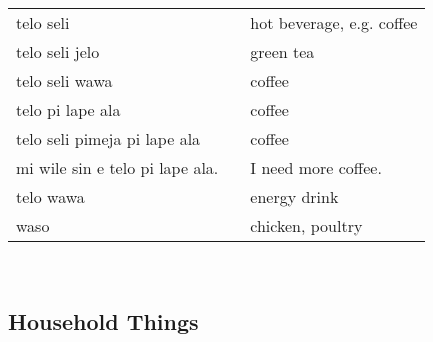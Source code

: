 \begin{supertabular}{p{4,5cm}|ll}
    telo seli                       &  & hot beverage, e.g. coffee                              \\
    telo seli jelo                  &  & green tea                                              \\
    telo seli wawa                  &  & coffee                                                 \\
    telo pi lape ala                &  & coffee                                                 \\
    telo seli pimeja pi lape ala    &  & coffee                                                 \\
    mi wile sin e telo pi lape ala. &  & I need more coffee.                                    \\
    telo wawa                       &  & energy drink                                           \\
    waso                            &  & chicken, poultry                                       \\
\end{supertabular} \\

\subsection{Household Things}

